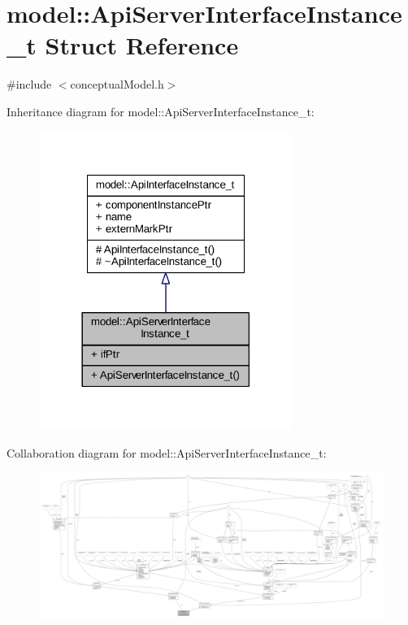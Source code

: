 \hypertarget{structmodel_1_1_api_server_interface_instance__t}{}\section{model\+:\+:Api\+Server\+Interface\+Instance\+\_\+t Struct Reference}
\label{structmodel_1_1_api_server_interface_instance__t}


{\ttfamily \#include $<$conceptual\+Model.\+h$>$}



Inheritance diagram for model\+:\+:Api\+Server\+Interface\+Instance\+\_\+t\+:
\nopagebreak
\begin{figure}[H]
\begin{center}
\leavevmode
\includegraphics[width=234pt]{structmodel_1_1_api_server_interface_instance__t__inherit__graph}
\end{center}
\end{figure}


Collaboration diagram for model\+:\+:Api\+Server\+Interface\+Instance\+\_\+t\+:
\nopagebreak
\begin{figure}[H]
\begin{center}
\leavevmode
\includegraphics[width=350pt]{structmodel_1_1_api_server_interface_instance__t__coll__graph}
\end{center}
\end{figure}
